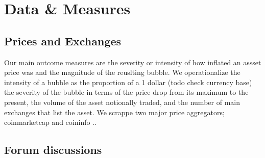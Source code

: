 \section{Data \& Measures}



\subsection{Prices and Exchanges}

Our main outcome measures are the severity or intensity of how inflated an assset price was and the magnitude of the reuslting bubble. 
We operationalize the  intensity of a bubble as the proportion of a 1 dollar (todo check currency base) 
the severity of the bubble in terms of the price drop from its maximum to the present, the volume of the asset notionally traded, and the number of main exchanges that list the asset.
We scrappe two major price aggregators; coinmarketcap and coininfo ..


\subsection{Forum discussions}



